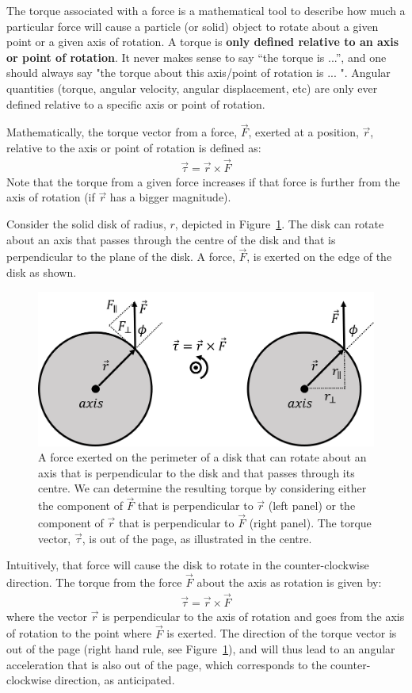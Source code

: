 The torque associated with a force is a mathematical tool to describe how much a particular force will cause a particle (or solid) object to rotate about a given point or a given axis of rotation. A torque is \textbf{only defined relative to an axis or point of rotation}. It never makes sense to say ``the torque is ...'', and one should always say "the torque about this axis/point of rotation is ... ". Angular quantities (torque, angular velocity, angular displacement, etc) are only ever defined relative to a specific axis or point of rotation.

Mathematically, the torque vector from a force, $\vec F$, exerted at a position, $\vec r$, relative to the axis or point of rotation is defined as:
\begin{align*}
\vec \tau = \vec r \times \vec F
\end{align*}
Note that the torque from a given force increases if that force is further from the axis of rotation (if $\vec r$ has a bigger magnitude).

Consider the solid disk of radius, $r$, depicted in Figure~\ref{fig:rotationaldynamics:disk}. The disk can rotate about an axis that passes through the centre of the disk and that is perpendicular to the plane of the disk. A force, $\vec F$, is exerted on the edge of the disk as shown.

\begin{figure}[!htbp]
\centering
\includegraphics[width=0.625\linewidth]{files/disk-d8d34efd7991e5388b8a772997d35de6.png}
\caption[]{A force exerted on the perimeter of a disk that can rotate about an axis that is perpendicular to the disk and that passes through its centre. We can determine the resulting torque by considering either the component of $\vec F$ that is perpendicular to $\vec r$ (left panel) or the component of $\vec r$ that is perpendicular to $\vec F$ (right panel). The torque vector, $\vec \tau$, is out of the page, as illustrated in the centre.}
\label{fig:rotationaldynamics:disk}
\end{figure}

Intuitively, that force will cause the disk to rotate in the counter-clockwise direction. The torque from the force $\vec F$ about the axis as rotation is given by:
\begin{align*}
\vec \tau = \vec r \times \vec F
\end{align*}
where the vector $\vec r$ is perpendicular to the axis of rotation and goes from the axis of rotation to the point where $\vec F$ is exerted. The direction of the torque vector is out of the page (right hand rule, see Figure~\ref{fig:rotationaldynamics:disk}), and will thus lead to an angular acceleration that is also out of the page, which corresponds to the counter-clockwise direction, as anticipated.

